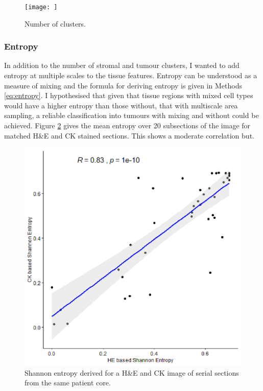 \begin{figure}
    \centering
    \texttt{[image: ]}
    \caption{Number of clusters.}
    \label{fig:dbscatter}
\end{figure}

\subsubsection*{Entropy}
In addition to the number of stromal and tumour clusters, I wanted to add entropy at multiple scales to the tissue features. Entropy can be understood as a measure of mixing and the formula for deriving entropy is given in Methods \ref{eq:entropy}. I hypothesised that given that tissue regions with mixed cell types would have a higher entropy than those without, that with multiscale area sampling, a reliable classification into tumours with mixing and without could be achieved. Figure \ref{fig:entropy} gives the mean entropy over 20 subsections of the image for matched H\&E and CK stained sections. This shows a moderate correlation but. 

\begin{figure}
    \centering
    \includegraphics{Chapter3/Figs/Thesis-06.png}
    \caption{Shannon entropy derived for a H\&E and CK image of serial sections from the same patient core.}
    \label{fig:entropy}
\end{figure}


